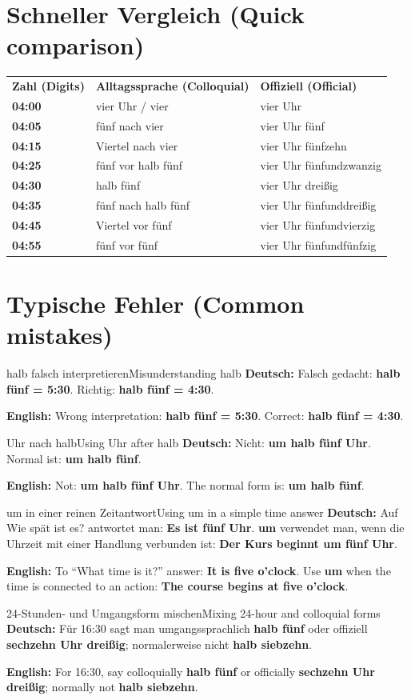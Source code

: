 \documentclass[a4paper,11pt]{article}
\newcommand{\GermanText}[1]{\textbf{Deutsch: }#1\par}
\newcommand{\EnglishText}[1]{{\small\color{SoftGray}\textbf{English: }#1\par}}
\begin{document}
\section{Schneller Vergleich \textnormal{(Quick comparison)}}
\begin{longtable}{>{\bfseries}p{2.5cm}|p{5.3cm}|p{5.3cm}}
\rowcolor{HeaderBlueDark}\color{white}\textbf{Zahl (Digits)}&\color{white}\textbf{Alltagssprache (Colloquial)}&\color{white}\textbf{Offiziell (Official)}\\
04:00 & vier Uhr / vier & vier Uhr \\
04:05 & fünf nach vier & vier Uhr fünf \\
04:15 & Viertel nach vier & vier Uhr fünfzehn \\
04:25 & fünf vor halb fünf & vier Uhr fünfundzwanzig \\
04:30 & halb fünf & vier Uhr dreißig \\
04:35 & fünf nach halb fünf & vier Uhr fünfunddreißig \\
04:45 & Viertel vor fünf & vier Uhr fünfundvierzig \\
04:55 & fünf vor fünf & vier Uhr fünfundfünfzig \\
\end{longtable}
\section{Typische Fehler \textnormal{(Common mistakes)}}
\begin{grammarentry}{halb falsch interpretieren}{Misunderstanding halb}
\GermanText{Falsch gedacht: \textbf{halb fünf = 5:30}. Richtig: \textbf{halb fünf = 4:30}.}
\EnglishText{Wrong interpretation: \textbf{halb fünf = 5:30}. Correct: \textbf{halb fünf = 4:30}.}
\end{grammarentry}
\begin{grammarentry}{Uhr nach halb}{Using Uhr after halb}
\GermanText{Nicht: \textbf{um halb fünf Uhr}. Normal ist: \textbf{um halb fünf}.}
\EnglishText{Not: \textbf{um halb fünf Uhr}. The normal form is: \textbf{um halb fünf}.}
\end{grammarentry}
\begin{grammarentry}{um in einer reinen Zeitantwort}{Using um in a simple time answer}
\GermanText{Auf \glqq Wie spät ist es?\grqq{} antwortet man: \textbf{Es ist fünf Uhr}. \textbf{um} verwendet man, wenn die Uhrzeit mit einer Handlung verbunden ist: \textbf{Der Kurs beginnt um fünf Uhr}.}
\EnglishText{To ``What time is it?'' answer: \textbf{It is five o'clock}. Use \textbf{um} when the time is connected to an action: \textbf{The course begins at five o'clock}.}
\end{grammarentry}
\begin{grammarentry}{24-Stunden- und Umgangsform mischen}{Mixing 24-hour and colloquial forms}
\GermanText{Für 16:30 sagt man umgangssprachlich \textbf{halb fünf} oder offiziell \textbf{sechzehn Uhr dreißig}; normalerweise nicht \textbf{halb siebzehn}.}
\EnglishText{For 16:30, say colloquially \textbf{halb fünf} or officially \textbf{sechzehn Uhr dreißig}; normally not \textbf{halb siebzehn}.}
\end{grammarentry}
\end{document}
